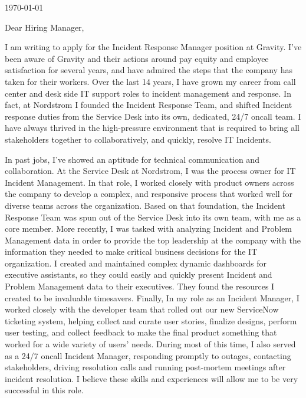 \documentclass[10pt,oneside]{article}
\begin{document}
\hfill\dte\today
\heading
\vspace{\baselineskip}
\vspace{\baselineskip}

Dear Hiring Manager,

\vspace{\baselineskip}

I am writing to apply for the Incident Response Manager position at Gravity. I've been aware of Gravity and their actions around pay equity and employee satisfaction for several years, and have admired the steps that the company has taken for their workers. Over the last 14 years, I have grown my career from call center and desk side IT support roles to incident management and response. In fact, at Nordstrom I founded the Incident Response Team, and shifted Incident response duties from the Service Desk into its own, dedicated, 24/7 oncall team. I have always thrived in the high-pressure environment that is required to bring all stakeholders together to collaboratively, and quickly, resolve IT Incidents.

\vspace{\baselineskip}

In past jobs, I’ve showed an aptitude for technical communication and collaboration. At the Service Desk at Nordstrom, I was the process owner for IT Incident Management. In that role, I worked closely with product owners across the company to develop a complex, and responsive process that worked well for diverse teams across the organization. Based on that foundation, the Incident Response Team was spun out of the Service Desk into its own team, with me as a core member. More recently, I was tasked with analyzing Incident and Problem Management data in order to provide the top leadership at the company with the information they needed to make critical business decisions for the IT organization. I created and maintained complex dynamic dashboards for executive assistants, so they could easily and quickly present Incident and Problem Management data to their executives. They found the resources I created to be invaluable timesavers. Finally, In my role as an Incident Manager, I worked closely with the developer team that rolled out our new ServiceNow ticketing system, helping collect and curate user stories, finalize designs, perform user testing, and collect feedback to make the final product something that worked for a wide variety of users' needs. During most of this time, I also served as a 24/7 oncall Incident Manager, responding promptly to outages, contacting stakeholders, driving resolution calls and running post-mortem meetings after incident resolution. I believe these skills and experiences will allow me to be very successful in this role.
\end{document}
